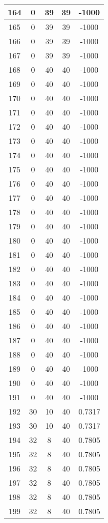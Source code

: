 \documentclass[letterpaper, 12pt]{article}
\begin{document}
\begin{longtable}{|c|c|c|c|c|}
164 & 0 & 39 & 39 & -1000 \\
\hline
165 & 0 & 39 & 39 & -1000 \\
\hline
166 & 0 & 39 & 39 & -1000 \\
\hline
167 & 0 & 39 & 39 & -1000 \\
\hline
168 & 0 & 40 & 40 & -1000 \\
\hline
169 & 0 & 40 & 40 & -1000 \\
\hline
170 & 0 & 40 & 40 & -1000 \\
\hline
171 & 0 & 40 & 40 & -1000 \\
\hline
172 & 0 & 40 & 40 & -1000 \\
\hline
173 & 0 & 40 & 40 & -1000 \\
\hline
174 & 0 & 40 & 40 & -1000 \\
\hline
175 & 0 & 40 & 40 & -1000 \\
\hline
176 & 0 & 40 & 40 & -1000 \\
\hline
177 & 0 & 40 & 40 & -1000 \\
\hline
178 & 0 & 40 & 40 & -1000 \\
\hline
179 & 0 & 40 & 40 & -1000 \\
\hline
180 & 0 & 40 & 40 & -1000 \\
\hline
181 & 0 & 40 & 40 & -1000 \\
\hline
182 & 0 & 40 & 40 & -1000 \\
\hline
183 & 0 & 40 & 40 & -1000 \\
\hline
184 & 0 & 40 & 40 & -1000 \\
\hline
185 & 0 & 40 & 40 & -1000 \\
\hline
186 & 0 & 40 & 40 & -1000 \\
\hline
187 & 0 & 40 & 40 & -1000 \\
\hline
188 & 0 & 40 & 40 & -1000 \\
\hline
189 & 0 & 40 & 40 & -1000 \\
\hline
190 & 0 & 40 & 40 & -1000 \\
\hline
191 & 0 & 40 & 40 & -1000 \\
\hline
192 & 30 & 10 & 40 & 0.7317 \\
\hline
193 & 30 & 10 & 40 & 0.7317 \\
\hline
194 & 32 & 8 & 40 & 0.7805 \\
\hline
195 & 32 & 8 & 40 & 0.7805 \\
\hline
196 & 32 & 8 & 40 & 0.7805 \\
\hline
197 & 32 & 8 & 40 & 0.7805 \\
\hline
198 & 32 & 8 & 40 & 0.7805 \\
\hline
199 & 32 & 8 & 40 & 0.7805 \\
\hline
\end{longtable}
\end{document}
